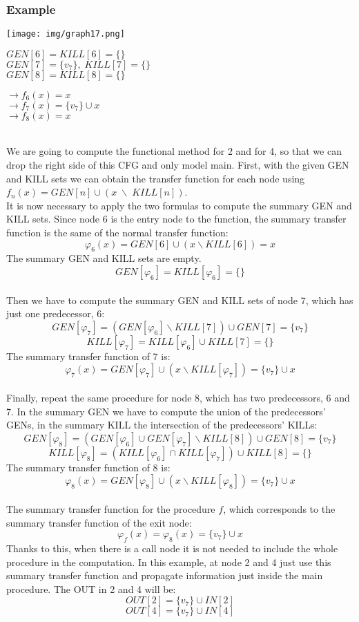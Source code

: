 \documentclass[a4paper, 10pt, titlepage]{article}
\begin{document}
\subsubsection{Example}
\begin{minipage}{0.35\textwidth}
\texttt{[image: img/graph17.png]}
\end{minipage}
\begin{minipage}{0.4\textwidth}
$GEN[6] = KILL[6] = \{\}$\\
$GEN[7] = \{v_7\}, \; KILL[7] = \{\}$\\
$GEN[8] = KILL[8] = \{\}$
\end{minipage}
\begin{minipage}{0.2\textwidth}
$\rightarrow f_6(x) = x$\\
$\rightarrow f_7(x) = \{v_7\} \cup x$\\
$\rightarrow f_8(x) = x$
\end{minipage}\\
We are going to compute the functional method for 2 and for 4, so that we can drop the right side of this CFG and only model main. First, with the given GEN and KILL sets we can obtain the transfer function for each node using $f_n(x) = GEN[n] \cup (x \; \backslash \; KILL[n])$. \medskip\\
It is now necessary to apply the two formulas to compute the summary GEN and KILL sets. Since node 6 is the entry node to the function, the summary transfer function is the same of the normal transfer function: 
$$\varphi_6 (x) = GEN[6] \cup (x \backslash KILL[6]) = x$$
The summary GEN and KILL sets are empty.
$$GEN[\varphi_6] = KILL[\varphi_6] =\{\}$$
\medskip\\ Then we have to compute the summary GEN and KILL sets of node 7, which has just one predecessor, 6:
$$GEN[\varphi_7] = (GEN[\varphi_6] \backslash KILL[7]) \cup GEN[7] = \{v_7\}$$
$$KILL[\varphi_7] = KILL[\varphi_6] \cup KILL[7] = \{\}$$
The summary transfer function of 7 is:
$$\varphi_7(x) = GEN[\varphi_7] \cup (x \backslash KILL[\varphi_7]) = \{v_7\} \cup x$$
\medskip\\ Finally, repeat the same procedure for node 8, which has two predecessors, 6 and 7. In the summary GEN we have to compute the union of the predecessors' GENs, in the summary KILL the intersection of the predecessors' KILLs:
$$GEN[\varphi_8] = (GEN[\varphi_6] \cup GEN[\varphi_7] \backslash KILL[8]) \cup GEN[8] = \{v_7\}$$
$$KILL[\varphi_8] = (KILL[\varphi_6] \cap KILL[\varphi_7]) \cup KILL[8] = \{\}$$
The summary transfer function of 8 is:
$$\varphi_8(x) = GEN[\varphi_8] \cup (x \backslash KILL[\varphi_8]) = \{v_7\} \cup x$$ 
\medskip\\ The summary transfer function for the procedure $f$, which corresponds to the summary transfer function of the exit node:
$$\varphi_f (x) = \varphi_8(x) = \{v_7\} \cup x$$
Thanks to this, when there is a call node it is not needed to include the whole procedure in the computation. In this example, at node 2 and 4 just use this summary transfer function and propagate information just inside the main procedure. The OUT in 2 and 4 will be:
$$OUT[2] = \{v_7\} \cup IN[2]$$
$$OUT[4] = \{v_7\} \cup IN[4]$$
\end{document}

